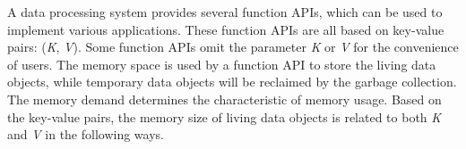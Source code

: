 A data processing system provides several function APIs, which can be used to implement various applications. 
These function APIs are all based on key-value pairs: (\textit{K}, \textit{V}). Some function APIs omit the parameter \textit{K} or \textit{V} for the convenience of users. 
The memory space is used by a function API to store the living data objects, while temporary data objects will be reclaimed by the garbage collection. The memory demand determines the characteristic of memory usage. Based on the key-value pairs, the memory size of living data objects is related to both \textit{K} and \textit{V} in the following ways.

